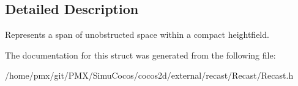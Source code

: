 \subsection{Detailed Description}
Represents a span of unobstructed space within a compact heightfield. 

The documentation for this struct was generated from the following file\+:\begin{DoxyCompactItemize}
\item 
/home/pmx/git/\+P\+M\+X/\+Simu\+Cocos/cocos2d/external/recast/\+Recast/Recast.\+h\end{DoxyCompactItemize}

